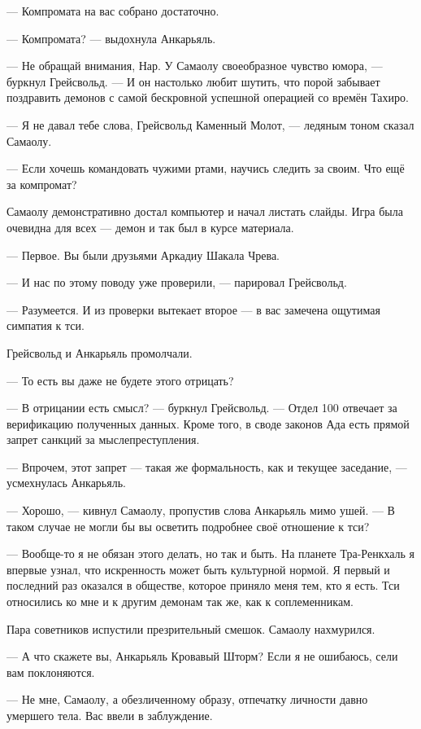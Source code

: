 \textspace

--- Компромата на вас собрано достаточно.

--- Компромата? --- выдохнула Анкарьяль.

--- Не обращай внимания, Нар.
У Самаолу своеобразное чувство юмора, --- буркнул Грейсвольд.
--- И он настолько любит шутить, что порой забывает поздравить демонов с самой бескровной успешной операцией со времён Тахиро.

--- Я не давал тебе слова, Грейсвольд Каменный Молот, --- ледяным тоном сказал Самаолу.

--- Если хочешь командовать чужими ртами, научись следить за своим.
Что ещё за компромат?

Самаолу демонстративно достал компьютер и начал листать слайды.
Игра была очевидна для всех --- демон и так был в курсе материала.

--- Первое.
Вы были друзьями Аркадиу Шакала Чрева.

--- И нас по этому поводу уже проверили, --- парировал Грейсвольд.

--- Разумеется.
И из проверки вытекает второе --- в вас замечена ощутимая симпатия к тси.

Грейсвольд и Анкарьяль промолчали.

--- То есть вы даже не будете этого отрицать?

--- В отрицании есть смысл? --- буркнул Грейсвольд.
--- Отдел 100 отвечает за верификацию полученных данных.
Кроме того, в своде законов Ада есть прямой запрет санкций за мыслепреступления.

--- Впрочем, этот запрет --- такая же формальность, как и текущее заседание, --- усмехнулась Анкарьяль.

--- Хорошо, --- кивнул Самаолу, пропустив слова Анкарьяль мимо ушей.
--- В таком случае не могли бы вы осветить подробнее своё отношение к тси?

--- Вообще-то я не обязан этого делать, но так и быть.
На планете Тра-Ренкхаль я впервые узнал, что искренность может быть культурной нормой.
Я первый и последний раз оказался в обществе, которое приняло меня тем, кто я есть.
Тси относились ко мне и к другим демонам так же, как к соплеменникам.

Пара советников испустили презрительный смешок.
Самаолу нахмурился.

--- А что скажете вы, Анкарьяль Кровавый Шторм?
Если я не ошибаюсь, сели вам поклоняются.

--- Не мне, Самаолу, а обезличенному образу, отпечатку личности давно умершего тела.
Вас ввели в заблуждение.

